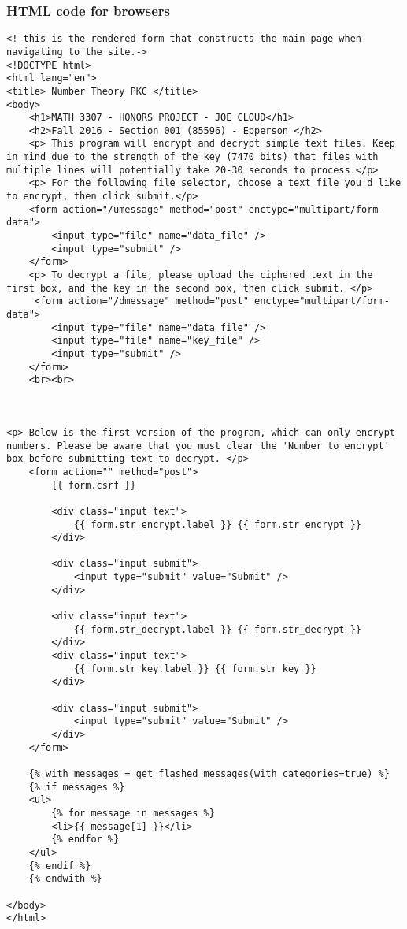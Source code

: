 \documentclass[a4paper]{article}
\begin{document}
\subsubsection{HTML code for browsers}
\begin{verbatim}
<!-this is the rendered form that constructs the main page when navigating to the site.->
<!DOCTYPE html>
<html lang="en">
<title> Number Theory PKC </title> 
<body>
    <h1>MATH 3307 - HONORS PROJECT - JOE CLOUD</h1>
    <h2>Fall 2016 - Section 001 (85596) - Epperson </h2>
    <p> This program will encrypt and decrypt simple text files. Keep in mind due to the strength of the key (7470 bits) that files with multiple lines will potentially take 20-30 seconds to process.</p>
    <p> For the following file selector, choose a text file you'd like to encrypt, then click submit.</p>
    <form action="/umessage" method="post" enctype="multipart/form-data">
        <input type="file" name="data_file" />
        <input type="submit" />
    </form>
    <p> To decrypt a file, please upload the ciphered text in the first box, and the key in the second box, then click submit. </p>  
     <form action="/dmessage" method="post" enctype="multipart/form-data">
        <input type="file" name="data_file" />
        <input type="file" name="key_file" />
        <input type="submit" />
    </form>
    <br><br>



<p> Below is the first version of the program, which can only encrypt numbers. Please be aware that you must clear the 'Number to encrypt' box before submitting text to decrypt. </p>  
    <form action="" method="post">
        {{ form.csrf }}

        <div class="input text">
            {{ form.str_encrypt.label }} {{ form.str_encrypt }}
        </div>

        <div class="input submit">
            <input type="submit" value="Submit" />
        </div>

        <div class="input text">
            {{ form.str_decrypt.label }} {{ form.str_decrypt }}
        </div>
        <div class="input text">
            {{ form.str_key.label }} {{ form.str_key }}
        </div>

        <div class="input submit">
            <input type="submit" value="Submit" />
        </div>
    </form>

    {% with messages = get_flashed_messages(with_categories=true) %}
    {% if messages %}
    <ul>
        {% for message in messages %}
        <li>{{ message[1] }}</li>
        {% endfor %}
    </ul>
    {% endif %}
    {% endwith %}

</body>
</html>
\end{verbatim}
\end{document}
